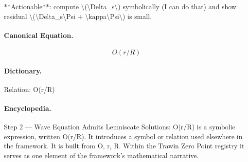 **Actionable**: compute \textbackslash{}(\textbackslash{}Delta\_s\textbackslash{}) symbolically (I can do that) and show residual \textbackslash{}(\textbackslash{}Delta\_s\textbackslash{}Psi + \textbackslash{}kappa\textbackslash{}Psi\textbackslash{}) is small.

\paragraph{Canonical Equation.}
\[
O(r/R)
\]

\paragraph{Dictionary.}
Relation: O(r/R)

\paragraph{Encyclopedia.}
Step 2 — Wave Equation Admits Lemniscate Solutions: O(r/R) is a symbolic expression, written O(r/R). It introduces a symbol or relation used elsewhere in the framework. It is built from O, r, R. Within the Trawin Zero Point registry it serves as one element of the framework's mathematical narrative.
